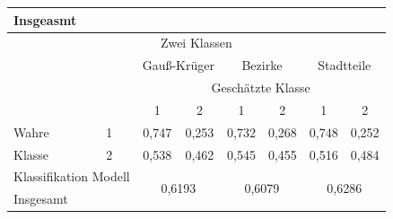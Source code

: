\documentclass{Vorlage}
\begin{document}
\begin{table}[h]
\begin{tabular}{lcccccccccc}
\multicolumn{2}{l|}{Insgeasmt}                                                                    & \multicolumn{3}{c|}{}                        & \multicolumn{3}{c|}{}                        & \multicolumn{3}{c}{}                   \\ \hline
\multicolumn{11}{c}{Zwei Klassen}                                                                                                                                                                                                        \\ \hline
                                                                         & \multicolumn{1}{l|}{}  & \multicolumn{3}{c|}{Gauß-Krüger}             & \multicolumn{3}{c|}{Bezirke}                  & \multicolumn{3}{c}{Stadtteile}         \\ \cline{3-11} 
                                                                         & \multicolumn{1}{l|}{}  & \multicolumn{9}{c}{Geschätzte Klasse}                                                                                                \\
                                                                         & \multicolumn{1}{l|}{}  & 1       & \multicolumn{2}{c|}{2}             & 1       & \multicolumn{2}{c|}{2}             & 1           & \multicolumn{2}{c}{2}    \\ \hline
Wahre                                                                    & \multicolumn{1}{l|}{1} & 0,747   & \multicolumn{2}{c|}{0,253}         & 0,732   & \multicolumn{2}{c|}{0,268}         & 0,748         & \multicolumn{2}{c}{0,252}    \\
Klasse                                                                   & \multicolumn{1}{l|}{2} & 0,538   & \multicolumn{2}{c|}{0,462}         & 0,545   & \multicolumn{2}{c|}{0,455}         & 0,516       & \multicolumn{2}{c}{0,484}    \\ \hline
\multicolumn{2}{l|}{Klassifikation Modell}                                                        & \multicolumn{3}{c|}{\multirow{2}{*}{0,6193}} & \multicolumn{3}{c|}{\multirow{2}{*}{0,6079}} & \multicolumn{3}{c}{\multirow{2}{*}{0,6286}} \\
\multicolumn{2}{l|}{Insgesamt}                                                                    & \multicolumn{3}{c|}{}                        & \multicolumn{3}{c|}{}                        & \multicolumn{3}{c}{}                   \\ \hline \hline
\end{tabular}
\end{table}
\end{document}
